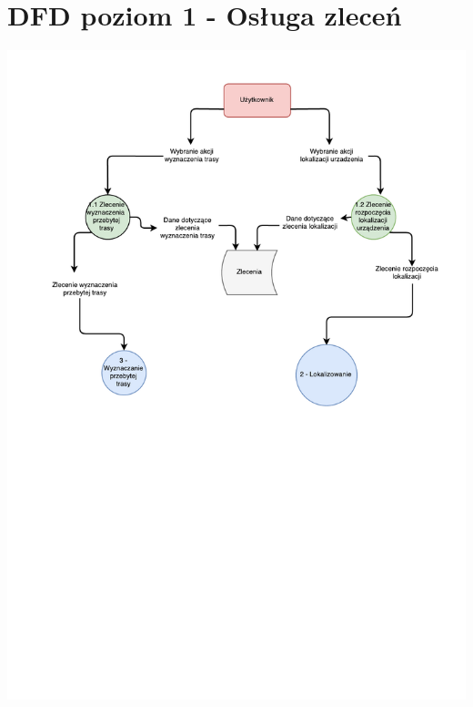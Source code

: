 \documentclass[11pt]{article}
\begin{document}
	\section{DFD poziom 1 - Osługa zleceń}
	\begin{center}
		\includegraphics[scale=0.8]{DFD1.pdf}
	\end{center}
	\newpage
\end{document}
